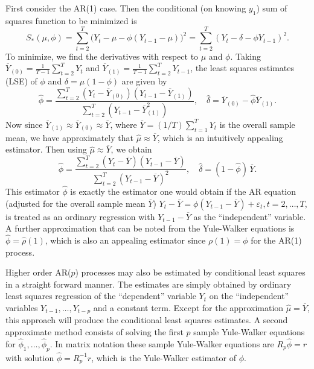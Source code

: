 First consider the AR(1) case. Then the conditional (on knowing $y_1$) sum of squares function to be minimized is
	\[
	S_*(\mu,\phi) = \sum_{t=2}^T \big(Y_t - \mu - \phi(Y_{t-1} - \mu) \big)^2 = \sum_{t=2}^T (Y_t - \delta - \phi Y_{t-1})^2.
	\]
To minimize, we find the derivatives with respect to $\mu$ and $\phi$. Taking $\overline{Y}_{(0)} = \frac{1}{T-1} \sum_{t=2}^T Y_t$ and $\overline{Y}_{(1)} = \frac{1}{T-1} \sum_{t=2}^T Y_{t-1}$, the least squares estimates (LSE) of $\phi$ and $\delta = \mu(1 - \phi)$ are given by
	\[
	\hat{\phi} = \dfrac{\sum_{t=2}^T ( Y_t - \overline{Y}_{(0)} ) (Y_{t-1} - \overline{Y}_{(1)} )}{\sum_{t=2}^T ( Y_{t-1} - \overline{Y}_{(1)}^2 )} ,  \quad \hat{\delta} = \overline{Y}_{(0)} - \hat{\phi}\overline{Y}_{(1)}.
	\]
Now since $\overline{Y}_{(1)} \approx \overline{Y}_{(0)} \approx \overline{Y}$, where $\overline{Y} = (1/T) \sum_{t=1}^T Y_t$ is the overall sample mean, we have approximately that $\hat{\mu} \approx \overline{Y}$, which is an intuitively appealing estimator. Then using $\hat{\mu} \approx \overline{Y}$, we obtain
	\begin{equation} \label{eqn:anotherhatphi}
	\hat{\phi} = \frac{\sum_{t=2}^T(Y_t - \overline{Y}) (Y_{t-1} - \overline{Y} )}{\sum_{t=2}^T (Y_{t-1} - \overline{Y})^2}, \quad \hat{\delta}= (1-\hat{\phi}) \, \overline{Y}.
	\end{equation}
This estimator $\hat{\phi}$ is exactly the estimator one would obtain if the AR equation (adjusted for the overall sample mean $\overline{Y}$) $Y_t - \overline{Y} = \phi(Y_{t-1} - \overline{Y}) + \varepsilon_t, t = 2, \ldots, T$, is treated as an ordinary regression with $Y_{t-1} - \overline{Y}$ as the ``independent'' variable. A further approximation that can be noted from the Yule-Walker equations is $\hat{\phi}= \hat{\rho}(1)$, which is also an appealing estimator since $\rho(1) = \phi$ for the AR(1) process. 


Higher order AR($p$) processes may also be estimated by conditional least squares in a straight forward manner. The estimates are simply obtained by ordinary least squares regression of the ``dependent'' variable $Y_t$ on the ``independent'' variables $Y_{t-1}, \ldots, Y_{t-p}$ and a constant term. Except for the approximation $\hat{\mu} = \overline{Y}$, this approach will produce the conditional least squares estimates. A second approximate method consists of solving the first $p$ sample Yule-Walker equations for $\hat{\phi}_1, \ldots, \hat{\phi}_p$. In matrix notation these sample Yule-Walker equations are $R_p\hat{\phi} = r$ with solution $\hat{\phi} = R_p^{-1} r$, which is the Yule-Walker estimator of $\phi$.



